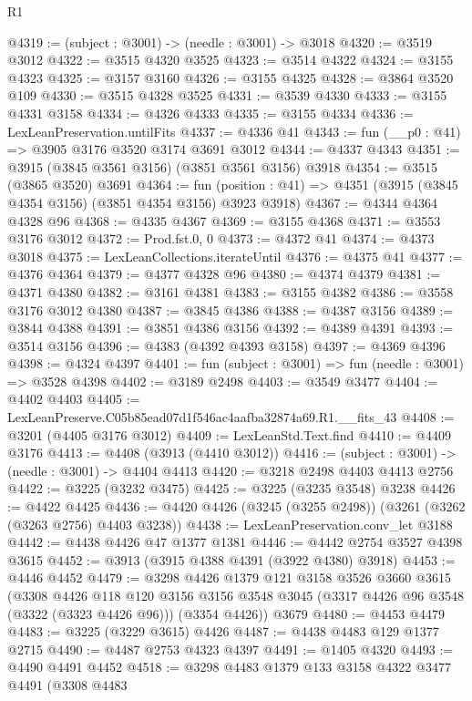 \begin{lexlean}{R1}
\begin{coremodule}
@4319 := (subject : @3001) -> (needle : @3001) -> @3018
@4320 := @3519 @3012
@4322 := @3515 @4320 @3525
@4323 := @3514 @4322
@4324 := @3155 @4323
@4325 := @3157 @3160
@4326 := @3155 @4325
@4328 := @3864 @3520 @109
@4330 := @3515 @4328 @3525
@4331 := @3539 @4330
@4333 := @3155 @4331 @3158
@4334 := @4326 @4333
@4335 := @3155 @4334
@4336 := LexLeanPreservation.untilFits
@4337 := @4336 @41
@4343 := fun (__p0 : @41) => @3905 @3176 @3520 @3174 @3691 @3012
@4344 := @4337 @4343
@4351 := @3915 (@3845 @3561 @3156) (@3851 @3561 @3156) @3918
@4354 := @3515 (@3865 @3520) @3691
@4364 := fun (position : @41) => @4351 (@3915 (@3845 @4354 @3156) (@3851 @4354 @3156) @3923 @3918)
@4367 := @4344 @4364 @4328 @96
@4368 := @4335 @4367
@4369 := @3155 @4368
@4371 := @3553 @3176 @3012
@4372 := Prod.fst.{0, 0}
@4373 := @4372 @41
@4374 := @4373 @3018
@4375 := LexLeanCollections.iterateUntil
@4376 := @4375 @41
@4377 := @4376 @4364
@4379 := @4377 @4328 @96
@4380 := @4374 @4379
@4381 := @4371 @4380
@4382 := @3161 @4381
@4383 := @3155 @4382
@4386 := @3558 @3176 @3012 @4380
@4387 := @3845 @4386
@4388 := @4387 @3156
@4389 := @3844 @4388
@4391 := @3851 @4386 @3156
@4392 := @4389 @4391
@4393 := @3514 @3156
@4396 := @4383 (@4392 @4393 @3158)
@4397 := @4369 @4396
@4398 := @4324 @4397
@4401 := fun (subject : @3001) => fun (needle : @3001) => @3528 @4398
@4402 := @3189 @2498
@4403 := @3549 @3477
@4404 := @4402 @4403
@4405 := LexLeanPreserve.C05b85ead07d1f546ac4aafba32874a69.R1.__fits_43
@4408 := @3201 (@4405 @3176 @3012)
@4409 := LexLeanStd.Text.find
@4410 := @4409 @3176
@4413 := @4408 (@3913 (@4410 @3012))
@4416 := (subject : @3001) -> (needle : @3001) -> @4404 @4413
@4420 := @3218 @2498 @4403 @4413 @2756
@4422 := @3225 (@3232 @3475)
@4425 := @3225 (@3235 @3548) @3238
@4426 := @4422 @4425
@4436 := @4420 @4426 (@3245 (@3255 @2498)) (@3261 (@3262 (@3263 @2756) @4403 @3238))
@4438 := LexLeanPreservation.conv_let @3188
@4442 := @4438 @4426 @47 @1377 @1381
@4446 := @4442 @2754 @3527 @4398 @3615
@4452 := @3913 (@3915 @4388 @4391 (@3922 @4380) @3918)
@4453 := @4446 @4452
@4479 := @3298
    @4426
    @1379
    @121
    @3158
    @3526
    @3660
    @3615
    (@3308
      @4426
      @118
      @120
      @3156
      @3156
      @3548
      @3045
      (@3317 @4426 @96 @3548 (@3322 (@3323 @4426 @96)))
      (@3354 @4426))
    @3679
@4480 := @4453 @4479
@4483 := @3225 (@3229 @3615) @4426
@4487 := @4438 @4483 @129 @1377 @2715
@4490 := @4487 @2753 @4323 @4397
@4491 := @1405 @4320
@4493 := @4490 @4491 @4452
@4518 := @3298
    @4483
    @1379
    @133
    @3158
    @4322
    @3477
    @4491
    (@3308
      @4483

\end{coremodule}
\end{lexlean}

